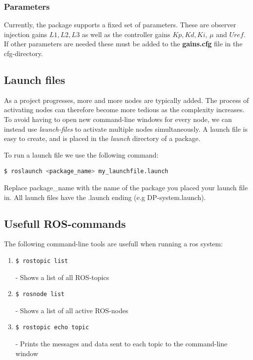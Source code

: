 \subsubsection{Parameters}

Currently, the package supports a fixed set of parameters. These are observer injection gains $L1, L2, L3$ as well as the controller gains $Kp, Kd, Ki$, $\mu$ and $Uref$. If other parameters are needed these must be added to the \textbf{gains.cfg} file in the cfg-directory. 

\subsection{Launch files}

As a project progresses, more and more nodes are typically added. The process of activating nodes can therefore become more tedious as the complexity increases. To avoid having to open new command-line windows for every node, we can instead use \textit{launch-files} to activate multiple nodes simultaneously. A launch file is easy to create, and is placed in the \textit{launch} directory of a package.

To run a launch file we use the following command: 

\begin{lstlisting}[language=bash,basicstyle=\mlttfamily, breaklines=true]
  $ roslaunch <package_name> my_launchfile.launch  
\end{lstlisting} 

Replace package\_name with the name of the package you placed your launch file in. All launch files have the .launch ending (e.g DP-system.launch). 

\subsection{Usefull ROS-commands}

The following command-line tools are usefull when running a ros system: 

\begin{enumerate}
    \item \begin{lstlisting}[language=bash,basicstyle=\mlttfamily, breaklines=true]
  $ rostopic list \end{lstlisting} - Shows a list of all ROS-topics 
  
    \item \begin{lstlisting}[language=bash,basicstyle=\mlttfamily, breaklines=true]
  $ rosnode list\end{lstlisting} -
    Shows a list of all active ROS-nodes
     \item \begin{lstlisting}[language=bash,basicstyle=\mlttfamily, breaklines=true]
  $ rostopic echo topic\end{lstlisting} - Prints the messages and data sent to each topic to the command-line window
\end{enumerate}



